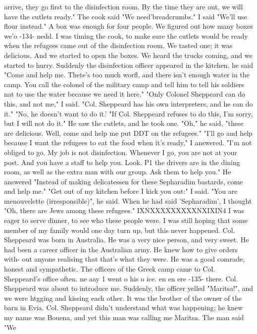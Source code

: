 arrive, they go first to the disinfection room. By the time they are out, we will 
have the cutlets ready." The cook said "We need'breadcrumbs." I said "We'll use 
flour instead." A box was enough for four people. We figured out how many boxes we'o 
-134- 
nedd. I was timing the cook, to make sure the cutlets would be ready when the refugees 
came out of the disinfection room. We tasted one; it was delicious. And we started 
to open the boxes. We heard the trucks coming, and we started to hurry. Suddenly 
the disinfection officer appeared in the kitchen. he said "Come and help me. Thete's 
too much worfl, and there isn't enough water in the camp. You call the colonel of the 
military camp and tell him to tell his soldiers nat to use the water because we need 
it here." 
"Only Colonel Sheppeard can do this, and not me," I said. "Col. Sheppeard has 
his own interpreters, and he can do it." 
"No, he doesn't want to do it.' 
"If Col. Sheppeard refuses to do this, I'm sorry, but I will not do it." 
He saw the cutlets, and he took one. "Oh," he said, "these are delicious. Well, 
come and help me put DDT on the refugees." 
"I'll go and help because I want the refugees to eat the food when it's ready," I 
answered. "I'm not obliged to go. My job is not disinfection. Whenever I go, you 
are not at your post. And you have a staff to help you. Look. P1 the drivers are 
in the dining room, as well as the extra man with our group. Ask them to help you." 
He answered "Instead of making delicatessen for these Sepharadim bastards, come 
and help me." 
"Get out of my kitchen before I kick you out:" I said. 
"You are menouvelette (irresponsible)", he said. When he had said 'Sepharadim', 
I thought "Oh, there are Jews among these refugees." IXNXXXXXXXXXNXIXIN4 I was eager 
to serve dinner, to see who these people were. I was still hoping that some member 
of my family would one day turn up, but this never happened. 
Col. Sheppeard was born in Australia. He was a very nice person, and very sweet. 
He had been a career officer in the Australian army. He knew how to give orders with-
out anyone realising that that's what they were. He was a good comrade, honest and 
sympathetic. The officers of the Greek camp came to Col. Sheppeard's office often. 
ne aay 1 went o his o ice. en en ere 
-135- 
there. Col. Sheppeard was about to introduce me. Suddenly, the officer yelled 
"Maritsa!", and we were htgging and kissing each other. It was the brother of the 
owner of the barn in Evia. Col. Sheppeard didn't understand what was happening; he 
knew my name was Bouena, and yet this man was calling me Maritsa. The man said "We 
